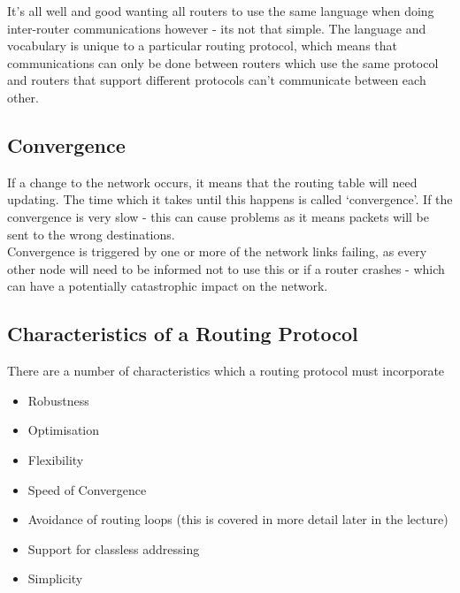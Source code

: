 It's all well and good wanting all routers to use the same language when doing inter-router communications however - its not that simple. The language and vocabulary is unique to a particular routing protocol, which means that communications can only be done between routers which use the same protocol and routers that support different protocols can't communicate between each other.

\subsection{Convergence}
If a change to the network occurs, it means that the routing table will need updating. The time which it takes until this happens is called `convergence'. If the convergence is very slow - this can cause problems as it means packets will be sent to the wrong destinations.\\

Convergence is triggered by one or more of the network links failing, as every other node will need to be informed not to use this or if a router crashes - which can have a potentially catastrophic impact on the network. 

\subsection{Characteristics of a Routing Protocol}
There are a number of characteristics which a routing protocol must incorporate
\begin{itemize}
    \item Robustness
    \item Optimisation
    \item Flexibility
    \item Speed of Convergence
    \item Avoidance of routing loops (this is covered in more detail later in the lecture)
    \item Support for classless addressing
    \item Simplicity
\end{itemize}

